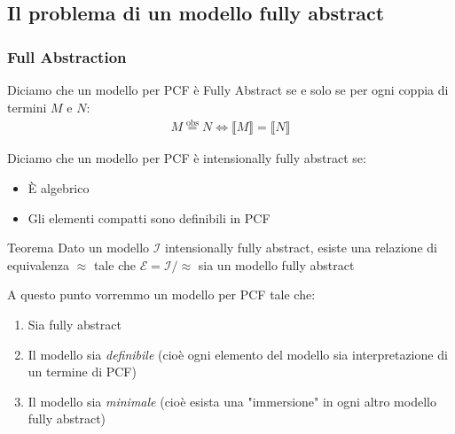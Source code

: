 \documentclass{beamer}
\newcommand{\eqobs}{\stackrel{\text{obs}}{=}}
\begin{document}
\subsection{Il problema di un modello fully abstract}
\begin{frame}
	
	\frametitle{Full Abstraction}
	
	\begin{block}{}
	Diciamo che un modello per PCF è Fully Abstract se e solo se per ogni coppia di termini $M$ e $N$:
	\begin{gather*}
		M \eqobs N \Leftrightarrow \llbracket M \rrbracket = \llbracket N \rrbracket
	\end{gather*}
	\end{block}
	
	\begin{block}{}
	Diciamo che un modello per PCF è intensionally fully abstract se:
	\begin{itemize}
		\item È algebrico
		\item Gli elementi compatti sono definibili in PCF
	\end{itemize}
	\end{block}
	
	\begin{block}{Teorema}
		Dato un modello $\mathcal{I}$ intensionally fully abstract, esiste una relazione di equivalenza $\approx$ tale che $\mathcal{E}=\mathcal{I}/ \approx$ sia un modello fully abstract
	\end{block}
	

\end{frame}



\begin{frame}
	

	
	A questo punto vorremmo un modello per PCF tale che:
	\begin{enumerate}
		\item Sia fully abstract
		\item Il modello sia \emph{definibile} (cioè ogni elemento del modello sia interpretazione di un termine di PCF)
		\item Il modello sia \emph{minimale} (cioè esista una "immersione" in ogni altro modello fully abstract)
	\end{enumerate}
	
	

\end{frame}
\end{document}
